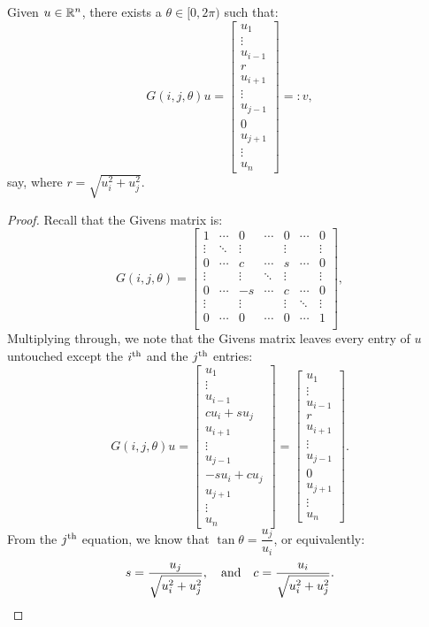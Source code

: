 \begin{lemma}\label{lemma:GivensZero}
Given $u\in\mathbb{R}^n$, there exists a $\theta\in[0,2\pi)$ such that:
\[
G(i,j,\theta)u = \begin{bmatrix}u_1\\\vdots \\u_{i-1}\\ r\\ u_{i+1}\\\vdots\\ u_{j-1}\\ 0\\u_{j+1}\\\vdots\\u_n\end{bmatrix} =: v,
\]
say, where $r = \sqrt{u_i^2+u_j^2}$.
\end{lemma}
\begin{proof}
Recall that the Givens matrix is:
\[
G(i,j,\theta) = \begin{bmatrix}
1 & \cdots & 0 & \cdots & 0 & \cdots & 0\\
\vdots & \ddots & \vdots & & \vdots & & \vdots\\
0 & \cdots & c & \cdots & s & \cdots & 0\\
\vdots & & \vdots & \ddots & \vdots & & \vdots\\
0 & \cdots & -s & \cdots & c & \cdots & 0\\
\vdots & & \vdots & & \vdots & \ddots & \vdots\\
0 & \cdots & 0 & \cdots & 0 & \cdots & 1\\
\end{bmatrix},
\]
Multiplying through, we note that the Givens matrix leaves every entry of $u$ untouched except the $i^{\rm th}$ and the $j^{\rm th}$ entries:
\[
G(i,j,\theta)u = \begin{bmatrix}u_1\\\vdots \\u_{i-1}\\ cu_i + s u_j\\ u_{i+1}\\\vdots\\ u_{j-1}\\ -su_i + c u_j\\u_{j+1}\\\vdots\\u_n\end{bmatrix} = \begin{bmatrix}u_1\\\vdots \\u_{i-1}\\ r\\ u_{i+1}\\\vdots\\ u_{j-1}\\ 0\\u_{j+1}\\\vdots\\u_n\end{bmatrix}.
\]
From the $j^{\rm th}$ equation, we know that $\tan\theta = \dfrac{u_j}{u_i}$, or equivalently:
\[
s = \dfrac{u_j}{\sqrt{u_i^2+u_j^2}},\quad{\rm and}\quad c = \dfrac{u_i}{\sqrt{u_i^2+u_j^2}}.
\]
\end{proof}
